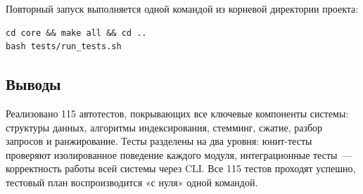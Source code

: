 \documentclass[a4paper,12pt]{article}
\begin{document}
Повторный запуск выполняется одной командой из корневой директории проекта:

\begin{verbatim}
cd core && make all && cd ..
bash tests/run_tests.sh
\end{verbatim}

\subsection{Выводы}

Реализовано 115 автотестов, покрывающих все ключевые компоненты системы: структуры данных, алгоритмы индексирования, стемминг, сжатие, разбор запросов и ранжирование. Тесты разделены на два уровня: юнит-тесты проверяют изолированное поведение каждого модуля, интеграционные тесты~--- корректность работы всей системы через CLI. Все 115 тестов проходят успешно, тестовый план воспроизводится «с нуля» одной командой.
\end{document}
